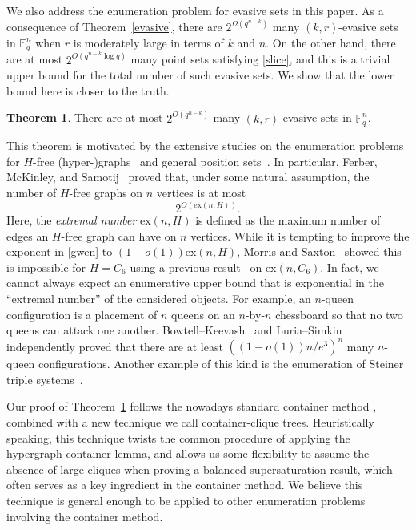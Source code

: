 \documentclass[11pt]{article}
\theoremstyle{definition}
\newtheorem{theorem}{Theorem}[section]
\begin{document}
We also address the enumeration problem for evasive sets in this paper. As a consequence of Theorem~\ref{evasive}, there are $2^{\Omega\left(q^{n-k}\right)}$ many $(k,r)$-evasive sets in $\mathbb{F}_q^n$ when $r$ is moderately large in terms of $k$ and $n$. On the other hand, there are at most $2^{O\left(q^{n-k}\log q\right)}$ many point sets satisfying \eqref{slice}, and this is a trivial upper bound for the total number of such evasive sets. We show that the lower bound here is closer to the truth.
\begin{theorem}\label{counting}
    There are at most $2^{O(q^{n-k})}$ many $(k,r)$-evasive sets in $\mathbb{F}^n_q$.
\end{theorem}

This theorem is motivated by the extensive studies on the enumeration problems for $H$-free (hyper-)graphs~\cite{erdos1976asymptotic, erdos1986asymptotic,kleitman1982number,nagle2006extremal,balogh2011number,morris2016534,ferber2020supersaturated} and general position sets~\cite{BS,roche2022arcs,bhowmick2022counting,chen2023random,nenadov2024number}. In particular, Ferber, McKinley, and Samotij~\cite{ferber2020supersaturated} proved that, under some natural assumption, the number of $H$-free graphs on $n$ vertices is at most \begin{equation}\label{gwen}
    2^{O(\text{ex}(n,H))}.
\end{equation} Here, the \textit{extremal number} $\text{ex}(n,H)$ is defined as the maximum number of edges an $H$-free graph can have on $n$ vertices. While it is tempting to improve the exponent in \eqref{gwen} to $(1+o(1))\text{ex}(n,H)$, Morris and Saxton~\cite{morris2016534} showed this is impossible for $H = C_6$ using a previous result~\cite{furedi2006turan} on $\text{ex}(n,C_6)$. In fact, we cannot always expect an enumerative upper bound that is exponential in the ``extremal number'' of the considered objects. For example, an $n$-queen configuration is a placement of $n$ queens on an $n$-by-$n$ chessboard so that no two queens can attack one another. Bowtell--Keevash~\cite{bowtell2021n} and Luria--Simkin~\cite{simkin2022lower} independently proved that there are at least $((1-o(1))n/e^3)^n$ many $n$-queen configurations. Another example of this kind is the enumeration of Steiner triple systems~\cite{keevash2018counting}.

Our proof of Theorem~\ref{counting} follows the nowadays standard container method \cite{balogh2015independent,saxton2015hypergraph}, combined with a new technique we call container-clique trees. Heuristically speaking, this technique twists the common procedure of applying the hypergraph container lemma, and allows us some flexibility to assume the absence of large cliques when proving a balanced supersaturation result, which often serves as a key ingredient in the container method. We believe this technique is general enough to be applied to other enumeration problems involving the container method.
\end{document}
